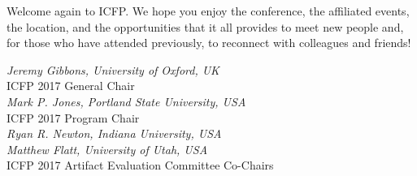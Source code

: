 Welcome again to ICFP. We hope you enjoy the conference, the affiliated events, the location, and the opportunities that it all provides to meet new people and, for those who have attended previously, to reconnect with colleagues and friends!

\begin{flushright}
\textit{Jeremy Gibbons, University of Oxford, UK} \\
ICFP 2017 General Chair 
\medskip \\
\textit{Mark P. Jones, Portland State University, USA} \\
ICFP 2017 Program Chair
\medskip \\
\textit{Ryan R. Newton, Indiana University, USA} \\
\textit{Matthew Flatt, University of Utah, USA} \\
ICFP 2017 Artifact Evaluation Committee Co-Chairs
\end{flushright}


\newpage
